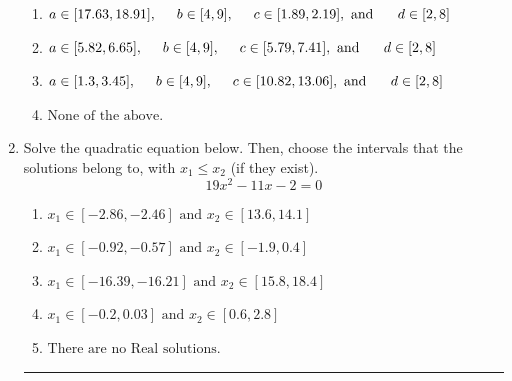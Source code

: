 \documentclass[14pt]{extbook}
\newcommand{\litem}[1]{\item#1\hspace*{-1cm}\rule{\textwidth}{0.4pt}}
\begin{document}
\begin{enumerate}
{\begin{enumerate}[label=\Alph*.]
\item \( a \in [17.63, 18.91], \hspace*{5mm} b \in [4, 9], \hspace*{5mm} c \in [1.89, 2.19], \text{ and } \hspace*{5mm} d \in [2, 8] \)
\item \( a \in [5.82, 6.65], \hspace*{5mm} b \in [4, 9], \hspace*{5mm} c \in [5.79, 7.41], \text{ and } \hspace*{5mm} d \in [2, 8] \)
\item \( a \in [1.3, 3.45], \hspace*{5mm} b \in [4, 9], \hspace*{5mm} c \in [10.82, 13.06], \text{ and } \hspace*{5mm} d \in [2, 8] \)
\item \( \text{None of the above.} \)

\end{enumerate} }
\litem{
Solve the quadratic equation below. Then, choose the intervals that the solutions belong to, with $x_1 \leq x_2$ (if they exist).\[ 19x^{2} -11 x -2 = 0 \]\begin{enumerate}[label=\Alph*.]
\item \( x_1 \in [-2.86, -2.46] \text{ and } x_2 \in [13.6, 14.1] \)
\item \( x_1 \in [-0.92, -0.57] \text{ and } x_2 \in [-1.9, 0.4] \)
\item \( x_1 \in [-16.39, -16.21] \text{ and } x_2 \in [15.8, 18.4] \)
\item \( x_1 \in [-0.2, 0.03] \text{ and } x_2 \in [0.6, 2.8] \)
\item \( \text{There are no Real solutions.} \)


\end{enumerate}}
\end{enumerate}
\end{document}
